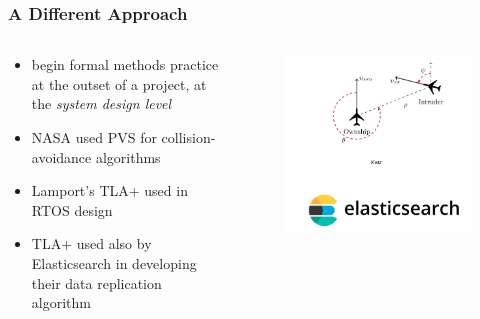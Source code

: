 \documentclass[
        11pt, %
]{beamer}
\begin{document}
\begin{frame}
    \frametitle{A Different Approach}
    \begin{columns}[c]
        \begin{column}{.6\textwidth}
        \begin{itemize}
            \item begin formal methods practice at the outset of a project, at the \emph{system design level}
            \item NASA used PVS for collision-avoidance algorithms
            \item Lamport's TLA+ used in RTOS design
            \item TLA+ used also by Elasticsearch in developing their data replication algorithm
        \end{itemize}
        \end{column}
        \begin{column}{.4\textwidth}
        \begin{figure}
            \includegraphics[width=.9\linewidth]{demoSystems.png}
        \end{figure}
        \end{column}
    \end{columns}
\end{frame}
\end{document}
